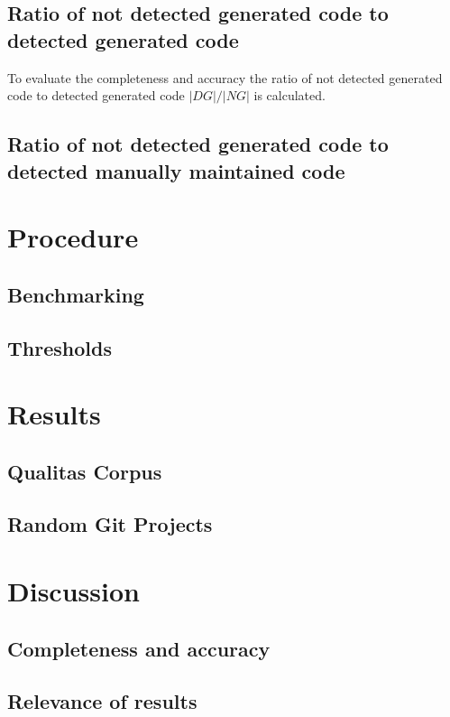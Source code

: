 \subsection{Ratio of not detected generated code to detected generated code}
To evaluate the completeness and accuracy the ratio of not detected generated code to detected generated code $|DG|/|NG|$ is calculated. 

\subsection{Ratio of not detected generated code to detected manually maintained code}

\section{Procedure}

\subsection{Benchmarking}

\subsection{Thresholds}

\section{Results}

\subsection{Qualitas Corpus}

\subsection{Random Git Projects}

\section{Discussion}

\subsection{Completeness and accuracy}

\subsection{Relevance of results}


